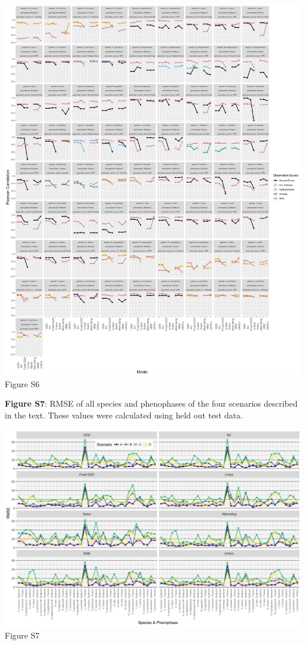 \documentclass[a4paper,12pt]{article}
\begin{document}
\begin{center}
	\centering
		\includegraphics[width=1\textwidth]{supplement_all_model_pearson.png}
	Figure S6
\end{center}


\newpage

\textbf{Figure S7}: RMSE of all species and phenophases of the four scenarios described in the text. These values were calculated using held out test data.

\newpage

\begin{center}
	\centering
		\includegraphics[width=1\textwidth]{supplement_scenario_absolute_rmse.png}
	Figure S7
\end{center}
\end{document}
